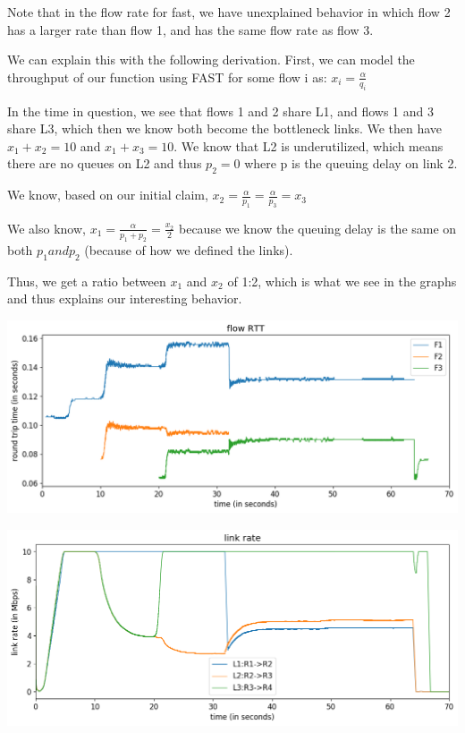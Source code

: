 \documentclass{article}
\begin{document}
Note that in the flow rate for fast, we have unexplained behavior in which flow 2 has a larger rate than flow 1, and has the same flow rate as flow 3. 

We can explain this with the following derivation. First, we can model the throughput of our function using FAST for some flow i as: $ x_i = \frac{\alpha}{q_i} $

In the time in question, we see that flows 1 and 2 share L1, and flows 1 and 3 share L3, which then we know both become the bottleneck links. We then have $x_1 + x_2 = 10 $ and $x_1 + x_3 = 10 $. We know that L2 is underutilized, which means there are no queues on L2 and thus $p_2 = 0 $ where p is the queuing delay on link 2.

We know, based on our initial claim, $ x_2 = \frac{\alpha}{p_1} = \frac{\alpha}{p_3}  = x_3$

We also know, $x_1 = \frac{\alpha}{p_1 + p_2} = \frac{x_2}{ 2}$ because we know the queuing delay is the same on both $p_1 and p_2$ (because of how we defined the links).

Thus, we get a ratio between $x_1$ and $x_2$ of 1:2, which is what we see in the graphs and thus explains our interesting behavior.



\includegraphics[width = \textwidth]{"test_case2_fast flow RTT"}

\includegraphics[width = \textwidth]{"test_case2_fast link rate"}
\end{document}
